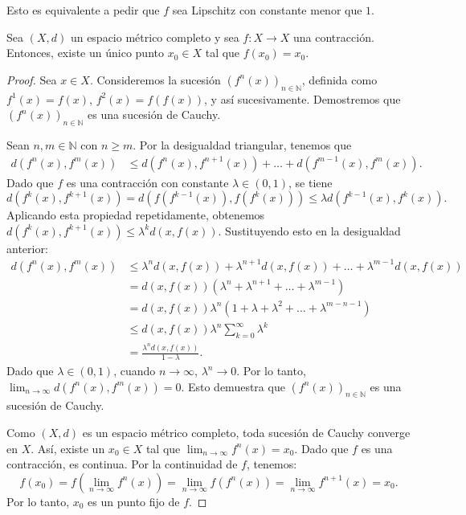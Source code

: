 \begin{remark}
	Esto es equivalente a pedir que $f$ sea Lipschitz con constante menor que $1$.
\end{remark}

\begin{theorem}
	Sea $(X,d)$ un espacio métrico completo y sea $f:X \to X$ una contracción. Entonces, existe un único punto $x_0 \in X$ tal que $f(x_0) = x_0$.
\end{theorem}

\begin{proof}
	Sea $x \in X$. Consideremos la sucesión $(f^n(x))_{n \in \mathbb{N}}$, definida como $f^1(x)=f(x)$, $f^2(x)=f(f(x))$, y así sucesivamente.
	Demostremos que $(f^n(x))_{n \in \mathbb{N}}$ es una sucesión de Cauchy.

	Sean $n, m \in \mathbb{N}$ con $n \ge m$. Por la desigualdad triangular, tenemos que
	\begin{align*}
		d(f^n(x), f^m(x)) & \le d(f^n(x), f^{n+1}(x)) + \dots + d(f^{m-1}(x), f^m(x)).
	\end{align*}
	Dado que $f$ es una contracción con constante $\lambda \in (0,1)$, se tiene
	$$
		d(f^k(x), f^{k+1}(x)) = d(f(f^{k-1}(x)), f(f^k(x))) \le \lambda d(f^{k-1}(x), f^k(x)).
	$$
	Aplicando esta propiedad repetidamente, obtenemos $d(f^k(x), f^{k+1}(x)) \le \lambda^k d(x, f(x))$.
	Sustituyendo esto en la desigualdad anterior:
	\begin{align*}
		d(f^n(x), f^m(x)) & \le \lambda^n d(x, f(x)) + \lambda^{n+1} d(x, f(x)) + \dots + \lambda^{m-1} d(x, f(x)) \\
		                  & = d(x, f(x)) (\lambda^n + \lambda^{n+1} + \dots + \lambda^{m-1})                       \\
		                  & = d(x, f(x)) \lambda^n (1 + \lambda + \lambda^2 + \dots + \lambda^{m-n-1})             \\
		                  & \le d(x, f(x)) \lambda^n \sum_{k=0}^{\infty} \lambda^k                                 \\
		                  & = \frac{\lambda^n d(x,f(x))}{1-\lambda}.
	\end{align*}
	Dado que $\lambda \in (0,1)$, cuando $n \to \infty$, $\lambda^n \to 0$. Por lo tanto, $\lim_{n \to \infty} d(f^n(x), f^m(x)) = 0$. Esto demuestra que $(f^n(x))_{n \in \mathbb{N}}$ es una sucesión de Cauchy.

	Como $(X,d)$ es un espacio métrico completo, toda sucesión de Cauchy converge en $X$. Así, existe un $x_0 \in X$ tal que $\lim_{n \to \infty} f^n(x) = x_0$.
	Dado que $f$ es una contracción, es continua. Por la continuidad de $f$, tenemos:
	$$f(x_0) = f\left(\lim_{n \to \infty} f^n(x)\right) = \lim_{n \to \infty} f(f^n(x)) = \lim_{n \to \infty} f^{n+1}(x) = x_0.$$
	Por lo tanto, $x_0$ es un punto fijo de $f$.


\end{proof}
